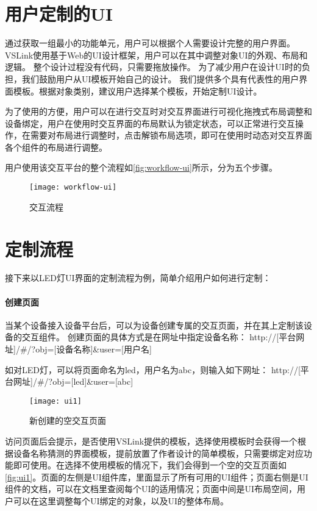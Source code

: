  
\section{用户定制的UI}
通过获取一组最小的功能单元，用户可以根据个人需要设计完整的用户界面。
VSLink使用基于Web的UI设计框架，用户可以在其中调整对象UI的外观、布局和逻辑。
整个设计过程没有代码，只需要拖放操作。
为了减少用户在设计UI时的负担，我们鼓励用户从UI模板开始自己的设计。
我们提供多个具有代表性的用户界面模板。根据对象类别，建议用户选择某个模板，开始定制UI设计。

为了使用的方便，用户可以在进行交互时对交互界面进行可视化拖拽式布局调整和设备绑定，用户在使用时交互界面的布局默认为锁定状态，可以正常进行交互操作，在需要对布局进行调整时，点击解锁布局选项，即可在使用时动态对交互界面各个组件的布局进行调整。

用户使用该交互平台的整个流程如\autoref{fig:workflow-ui}所示，分为五个步骤。

\begin{figure}[htbp]
	\centering
	\texttt{[image: workflow-ui]}
	\caption{交互流程}
	\label{fig:workflow-ui}
\end{figure}

\section{定制流程}
接下来以LED灯UI界面的定制流程为例，简单介绍用户如何进行定制：
\paragraph{创建页面}
当某个设备接入设备平台后，可以为设备创建专属的交互页面，并在其上定制该设备的交互组件。
创建页面的具体方式是在网址中指定设备名称：
http://[平台网址]/\#/?obj=[设备名称]\&user=[用户名]

如对LED灯，可以将页面命名为led，用户名为abc，则输入如下网址：
http://[平台网址]/\#/?obj=[led]\&user=[abc]

\begin{figure}[htbp]
	\centering
	\texttt{[image: ui1]}
	\caption{新创建的空交互页面}
	\label{fig:ui1}
\end{figure}

访问页面后会提示，是否使用VSLink提供的模板，选择使用模板时会获得一个根据设备名称猜测的界面模板，提前放置了作者设计的简单模板，只需要绑定对应功能即可使用。在选择不使用模板的情况下，我们会得到一个空的交互页面如\autoref{fig:ui1}。页面的左侧是UI组件库，里面显示了所有可用的UI组件；页面右侧是UI组件的文档，可以在文档里查阅每个UI的适用情况；页面中间是UI布局空间，用户可以在这里调整每个UI绑定的对象，以及UI的整体布局。

